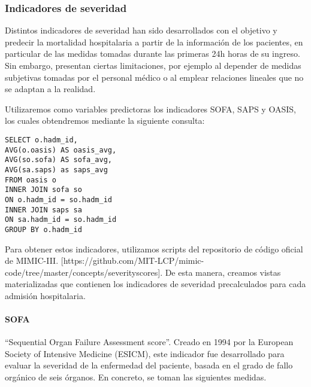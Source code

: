 \documentclass{report}
\begin{document}
\subsubsection{Indicadores de severidad}
Distintos indicadores de severidad han sido desarrollados con el
objetivo y predecir la mortalidad hospitalaria a partir de la
información de los pacientes, en particular de las medidas tomadas
durante las primeras 24h horas de su ingreso. Sin embargo, presentan
ciertas limitaciones, por ejemplo al depender de medidas subjetivas
tomadas por el personal médico o al emplear relaciones lineales que no
se adaptan a la realidad.

Utilizaremos como variables predictoras los indicadores SOFA, SAPS y
OASIS, los cuales obtendremos mediante la siguiente consulta:

\begin{verbatim}
SELECT o.hadm_id, 
AVG(o.oasis) AS oasis_avg, 
AVG(so.sofa) AS sofa_avg, 
AVG(sa.saps) as saps_avg
FROM oasis o
INNER JOIN sofa so
ON o.hadm_id = so.hadm_id
INNER JOIN saps sa
ON sa.hadm_id = so.hadm_id
GROUP BY o.hadm_id
\end{verbatim}

Para obtener estos indicadores, utilizamos scripts del repositorio de
código oficial de MIMIC-III.
{[}https://github.com/MIT-LCP/mimic-code/tree/master/concepts/severityscores{]}.
De esta manera, creamos vistas materializadas que contienen los
indicadores de severidad precalculados para cada admisión hospitalaria.

\paragraph{SOFA}

``Sequential Organ Failure Assessment score''. Creado en 1994 por la
European Society of Intensive Medicine (ESICM), este indicador fue
desarrollado para evaluar la severidad de la enfermedad del paciente,
basada en el grado de fallo orgánico de seis órganos. En concreto, se
toman las siguientes medidas.
\end{document}
